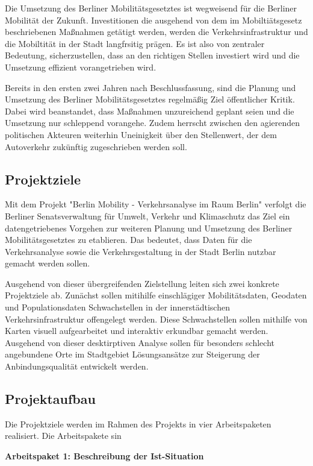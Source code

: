 Die Umsetzung des Berliner Mobilitätsgesetztes ist wegweisend für die Berliner Mobilität der Zukunft. Investitionen die ausgehend von dem im Mobiltiätsgesetz beschriebenen Maßnahmen getätigt werden, werden die Verkehrsinfrastruktur und die Mobiltität in der Stadt langfrsitig prägen. Es ist also von zentraler Bedeutung, sicherzustellen, dass an den richtigen Stellen investiert wird und die Umsetzung effizient vorangetrieben wird.

Bereits in den ersten zwei Jahren nach Beschlussfassung, sind die Planung und Umsetzung des Berliner Mobilitätsgesetztes regelmäßig Ziel öffentlicher Kritik. Dabei wird beanstandet, dass Maßnahmen unzureichend geplant seien und die Umsetzung nur schleppend vorangehe.  Zudem herrscht zwischen den agierenden politischen Akteuren weiterhin Uneinigkeit über den Stellenwert, der dem Autoverkehr zukünftig zugeschrieben werden soll.

\subsection{Projektziele}
Mit dem Projekt "Berlin Mobility - Verkehrsanalyse im Raum Berlin" verfolgt die Berliner Senatsverwaltung für Umwelt, Verkehr und Klimaschutz das Ziel ein datengetriebenes Vorgehen zur weiteren Planung und Umsetzung des Berliner Mobilitätsgesetztes zu etablieren. Das bedeutet, dass Daten für die Verkehrsanalyse sowie die Verkehrsgestaltung in der Stadt Berlin nutzbar gemacht werden sollen.

Ausgehend von dieser übergreifenden Zielstellung leiten sich zwei konkrete Projektziele ab. Zunächst sollen mitihilfe einschlägiger Mobilitätsdaten, Geodaten und Populationsdaten Schwachstellen in der innerstädtischen Verkehrsinfrastruktur offengelegt werden. Diese Schwachstellen sollen mithilfe von Karten visuell aufgearbeitet und interaktiv erkundbar gemacht werden. Ausgehend von dieser desktirptiven Analyse sollen für besonders schlecht angebundene Orte im Stadtgebiet Lösungsansätze zur Steigerung der Anbindungsqualität entwickelt werden.

\subsection{Projektaufbau}
Die Projektziele werden im Rahmen des Projekts in vier Arbeitspaketen realisiert. Die Arbeitspakete sin

\textbf{Arbeitspaket 1: Beschreibung der Ist-Situation}

